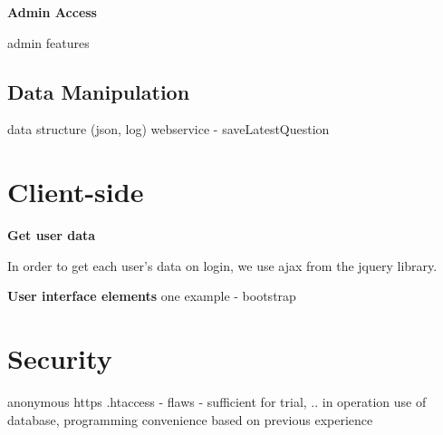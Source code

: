 \textbf{Admin Access}

admin features


\subsection{Data Manipulation}
data structure (json, log)
webservice - saveLatestQuestion

 
 
 
\section{Client-side}

\textbf{Get user data}

In order to get each user's data on login, we use ajax from the jquery library. 


\textbf{User interface elements}
one example
 - bootstrap
 
 
\section{Security}
anonymous
https
.htaccess
 - flaws
 - sufficient for trial, .. in operation use of database, programming convenience based on previous experience